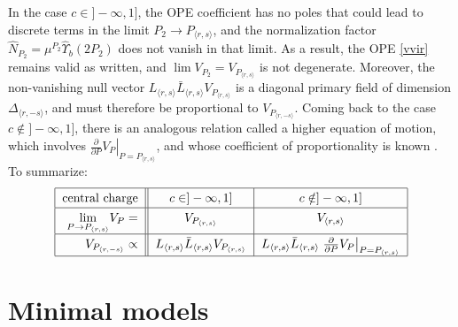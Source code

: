 \documentclass[12pt, a4paper, notitlepage, twoside]{report}
\numberwithin{equation}{section}
\theoremstyle{break}
\begin{document}
In the case $c\in]-\infty, 1]$, the OPE coefficient has no poles that could lead to discrete terms in the limit $P_2\to P_{\langle r,s\rangle}$, and the normalization factor $\hat N_{P_2} = \mu^{P_2}\hat\Upsilon_b(2P_2)$ does not vanish in that limit. As a result, the OPE \eqref{vvir} remains valid as written, and $\lim V_{P_2} = V_{P_{\langle r,s\rangle}}$ is not degenerate. Moreover, the non-vanishing null vector $L_{\langle r,s\rangle}\bar{L}_{\langle r,s\rangle} V_{P_{\langle r,s\rangle}}$ is a diagonal primary field of dimension $\Delta_{\langle r,-s\rangle}$, and must therefore be proportional to $V_{P_{\langle r,-s\rangle}}$. Coming back to the case $c\notin ]-\infty,1]$, there is an analogous relation called a higher equation of motion, which involves $\left.\frac{\partial}{\partial P} V_P\right|_{P=P_{\langle r,s\rangle}}$, and whose coefficient of proportionality is known \cite{zam03}. To summarize:
\begin{align}
\renewcommand{\arraystretch}{1.3}
 \begin{tabular}{|r||c|c|}
  \hline
  central charge &  $c\in ]-\infty, 1]$ & $c\notin ]-\infty, 1]$
  \\
  \hline
  $\underset{P\to P_{\langle r,s \rangle}}{\lim } V_P = $ & $ V_{P_{\langle r,s \rangle}}$  & $V_{\langle r,s \rangle}$ 
  \\
  \hline
  $V_{P_{\langle r,-s\rangle}} \propto$ 
  & $L_{\langle r,s\rangle}\bar{L}_{\langle r,s\rangle} V_{P_{\langle r,s\rangle}}$ 
  &  $L_{\langle r,s\rangle}\bar{L}_{\langle r,s\rangle} \left.\frac{\partial}{\partial P} V_P\right|_{P=P_{\langle r,s\rangle}}$
  \\
  \hline
 \end{tabular}
 \label{cicni}
\end{align}



\section{Minimal models \label{secvmm}}
\end{document}
